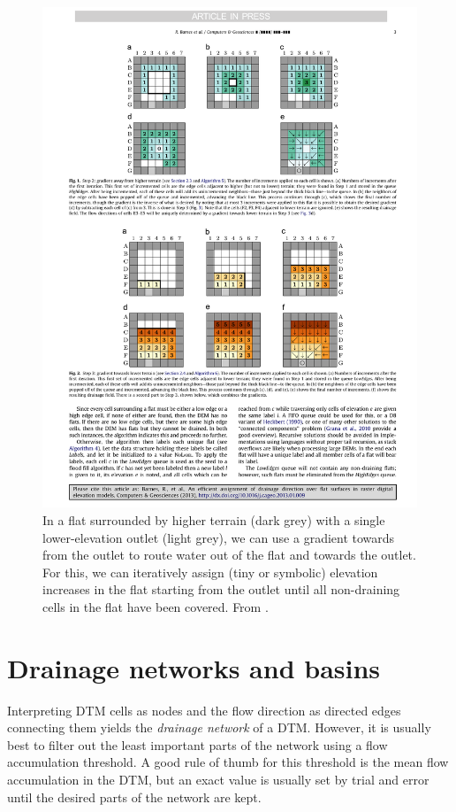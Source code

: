 \begin{figure}[htbp]
\centering
\includegraphics[width=1.0\linewidth]{figs/lt.pdf}
\caption{In a flat surrounded by higher terrain (dark grey) with a single lower-elevation outlet (light grey), we can use a gradient towards from the outlet to route water out of the flat and towards the outlet.
For this, we can iteratively assign (tiny or symbolic) elevation increases in the flat starting from the outlet until all non-draining cells in the flat have been covered.
From \citet{Barnes14}.}%
\label{fig:lt}
\end{figure}


\section{Drainage networks and basins}%
\label{sec:drainage_basins}


Interpreting DTM cells as nodes and the flow direction as directed edges connecting them yields the \emph{drainage network} of a DTM\@.
However, it is usually best to filter out the least important parts of the network using a flow accumulation threshold.
A good rule of thumb for this threshold is the mean flow accumulation in the DTM, but an exact value is usually set by trial and error until the desired parts of the network are kept.

